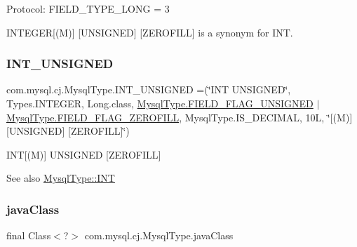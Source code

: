 Protocol\+: F\+I\+E\+L\+D\+\_\+\+T\+Y\+P\+E\+\_\+\+L\+O\+NG = 3

I\+N\+T\+E\+G\+ER\mbox{[}(M)\mbox{]} \mbox{[}U\+N\+S\+I\+G\+N\+ED\mbox{]} \mbox{[}Z\+E\+R\+O\+F\+I\+LL\mbox{]} is a synonym for I\+NT. \mbox{\label{enumcom_1_1mysql_1_1cj_1_1_mysql_type_aa15735863c9115877dc4d1f2c7690035}} 
\subsubsection{\texorpdfstring{I\+N\+T\+\_\+\+U\+N\+S\+I\+G\+N\+ED}{INT\_UNSIGNED}}
{\footnotesize\ttfamily com.\+mysql.\+cj.\+Mysql\+Type.\+I\+N\+T\+\_\+\+U\+N\+S\+I\+G\+N\+ED =(\char`\"{}I\+NT U\+N\+S\+I\+G\+N\+ED\char`\"{}, Types.\+I\+N\+T\+E\+G\+ER, Long.\+class, \mbox{\hyperlink{enumcom_1_1mysql_1_1cj_1_1_mysql_type_a2c6701614559b1ad9955cdc4ca6337e2}{Mysql\+Type.\+F\+I\+E\+L\+D\+\_\+\+F\+L\+A\+G\+\_\+\+U\+N\+S\+I\+G\+N\+ED}} $\vert$ \mbox{\hyperlink{enumcom_1_1mysql_1_1cj_1_1_mysql_type_abb76a1f2f3dac9a30d1b559b8ba66a48}{Mysql\+Type.\+F\+I\+E\+L\+D\+\_\+\+F\+L\+A\+G\+\_\+\+Z\+E\+R\+O\+F\+I\+LL}}, Mysql\+Type.\+I\+S\+\_\+\+D\+E\+C\+I\+M\+AL, 10\+L, \char`\"{}\mbox{[}(\+M)\mbox{]} \mbox{[}\+U\+N\+S\+I\+G\+N\+E\+D\mbox{]} \mbox{[}\+Z\+E\+R\+O\+F\+I\+L\+L\mbox{]}\char`\"{})}

I\+NT\mbox{[}(M)\mbox{]} U\+N\+S\+I\+G\+N\+ED \mbox{[}Z\+E\+R\+O\+F\+I\+LL\mbox{]}

\begin{DoxySeeAlso}{See also}
\mbox{\hyperlink{enumcom_1_1mysql_1_1cj_1_1_mysql_type_a01116c8fe484233659c251ee68f56d25}{Mysql\+Type\+::\+I\+NT}} 
\end{DoxySeeAlso}
\mbox{\label{enumcom_1_1mysql_1_1cj_1_1_mysql_type_acc498b3cc7c6fbb8dc86b72b60db102d}} 
\subsubsection{\texorpdfstring{java\+Class}{javaClass}}
{\footnotesize\ttfamily final Class$<$?$>$ com.\+mysql.\+cj.\+Mysql\+Type.\+java\+Class\hspace{0.3cm}{\ttfamily [protected]}}

